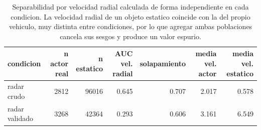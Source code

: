 \begin{table}[htbp]
  \centering
  \begin{tabular}{lrrrrrr}
    \toprule
    condicion & n actor real & n estatico & AUC vel. radial & solapamiento & media vel. actor & media vel. estatico \\
    \midrule
    radar crudo & 2812 & 96016 & 0.645 & 0.707 & 2.017 & 0.578 \\
    radar validado & 3268 & 42364 & 0.293 & 0.606 & 3.161 & 6.549 \\
    \bottomrule
  \end{tabular}
  \caption{Separabilidad por velocidad radial calculada de forma independiente en cada condicion. La velocidad radial de un objeto estatico coincide con la del propio vehiculo, muy distinta entre condiciones, por lo que agregar ambas poblaciones cancela sus sesgos y produce un valor espurio.}
  \label{tab:separabilidad_por_condicion}
\end{table}
